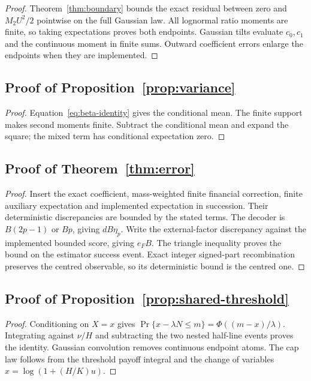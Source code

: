 \documentclass[11pt]{article}
\begin{document}
\begin{proof}
Theorem~\ref{thm:boundary} bounds the exact residual between zero and
$M_2U^2/2$ pointwise on the full Gaussian law. All lognormal ratio moments
are finite, so taking expectations proves both endpoints. Gaussian tilts
evaluate $c_0,c_1$ and the continuous moment in finite sums. Outward
coefficient errors enlarge the endpoints when they are implemented.
\end{proof}

\subsection{Proof of Proposition~\ref{prop:variance}}
\label{app:proof-variance}

\begin{proof}
Equation~\eqref{eq:beta-identity} gives the conditional mean. The finite
support makes second moments finite. Subtract the conditional mean and
expand the square; the mixed term has conditional expectation zero.
\end{proof}

\subsection{Proof of Theorem~\ref{thm:error}}
\label{app:proof-error}

\begin{proof}
Insert the exact coefficient, mass-weighted finite financial correction,
finite auxiliary expectation and implemented expectation in succession.
Their deterministic discrepancies are bounded by the stated terms.
The decoder is $B(2p-1)$ or $Bp$, giving $dB\eta_p$.
Write the external-factor discrepancy against the implemented bounded
score, giving $e_FB$. The triangle inequality proves the bound on the
estimator success event. Exact integer signed-part recombination preserves
the centred observable, so its deterministic bound is the centred one.
\end{proof}

\subsection{Proof of Proposition~\ref{prop:shared-threshold}}
\label{app:proof-shared-threshold}

\begin{proof}
Conditioning on $X=x$ gives
$\Pr\{x-\lambda N\leq m\}=\Phi((m-x)/\lambda)$.
Integrating against $\nu/H$ and subtracting the two nested half-line
events proves the identity. Gaussian convolution removes continuous
endpoint atoms. The cap law follows from the threshold payoff integral
and the change of variables $x=\log(1+(H/K)u)$.
\end{proof}
\end{document}
